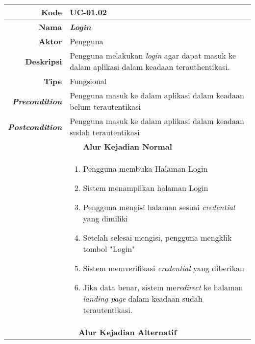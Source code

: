 \begin{table}[H]
	\centering
	\begin{tabular}{|r|p{8cm}|}
		\hline
		\textbf{Kode}                                                    & UC-01.02                                                     \\ \hline
		\textbf{Nama}                                                    & \textbf{\textit{Login}}                                         \\ \hline
		\textbf{Aktor}                                                   & Pengguna                                                    \\ \hline
		\textbf{Deskripsi}                                               & Pengguna melakukan \textit{login} agar dapat masuk ke dalam aplikasi dalam keadaan terauthentikasi. \\ \hline
		\textbf{Tipe}                                                    & Fungsional                                                  \\ \hline
		\textbf{\textit{Precondition}}
		& Pengguna masuk ke dalam aplikasi dalam keadaan belum terautentikasi                    \\ \hline
		\textbf{\textit{Postcondition}} 
		& Pengguna masuk ke dalam aplikasi dalam keadaan sudah terautentikasi          \\ \hline
		\multicolumn{2}{|c|}{\textbf{Alur Kejadian Normal}}                                                                            \\ \hline
		\multicolumn{1}{|l|}{}                                           & 
		\begin{enumerate}
			\item Pengguna membuka Halaman Login
			\item \label{uc0102-show1page}Sistem menampilkan halaman Login
			\item Pengguna mengisi halaman sesuai \textit{credential} yang dimiliki
			\item Setelah selesai mengisi, pengguna mengklik tombol "Login"
			\item \label{al-0102-a} Sistem memverifikasi \textit{credential} yang diberikan
			\item Jika data benar, sistem me\textit{redirect} ke halaman \textit{landing page} dalam keadaan sudah terautentikasi.
		\end{enumerate}
		\\ \hline
		\multicolumn{2}{|c|}{\textbf{Alur Kejadian Alternatif}}                                                         \\ \hline

\end{tabular}
\end{table}
